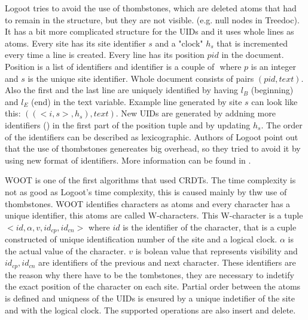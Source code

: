 \documentclass[12pt,oneside]{fithesis2}
\begin{document}
\par Logoot tries to avoid the use of thombstones, which are deleted atoms that had to remain in the structure, but they are not visible. (e.g. null nodes in Treedoc). It has a bit more complicated structure for the UIDs and it uses whole lines as atoms. Every site has its site identifier \(s\) and a "clock" \(h_s\) that is incremented every time a line is created. Every line has its position \(pid\) in the document. Position is a list of identifiers and identifier is a couple of \(<p,s>\) where \(p\) is an integer and \(s\) is the unique site identifier. Whole document consists of pairs \((pid,text)\). Also the first and the last line are uniquely identified by having \(l_B\) (beginning) and \(l_E\) (end) in the text variable. Example line generated by site \(s\) can look like this: \( ((<i,s>,h_s),text) \). New UIDs are generated by addning more identifiers (\(<i,s>\)) in the first part of the position tuple and by updating \(h_s\). The order of the identifiers can be described as lexicographic. Authors of Logoot point out that the use of thombstones genereates big overhead, so they tried to avoid it by using new format of identifiers. More information can be found in \cite{Logoot}.
\par WOOT is one of the first algorithms that used CRDTs. The time complexity is not as good as Logoot's time complexity, this is caused mainly by thw use of thombstones. WOOT identifies characters as atoms and every character has a unique identifier, this atoms are called W-characters. This W-character is a tuple \( <id,\alpha,v,id_{cp},id_{cn}> \) where \(id\) is the identifier of the character, that is a cuple constructed of unique identification number of the site and a logical clock. \(\alpha\) is the actual value of the character. \(v\) is bolean value that represents visibility and \( id_{cp}, id_{cn} \) are identifiers of the previous and next character. These identifiers are the reason why there have to be the tombstones, they are necessary to indetify the exact position of the character on each site. Partial order between the atoms is defined and uniqness of the UIDs is ensured by a unique indetifier of the site and with the logical clock. The supported operations are also insert and delete. 
\end{document}
